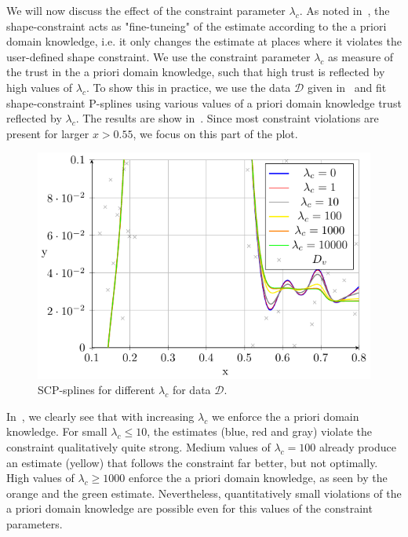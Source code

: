 We will now discuss the effect of the constraint parameter $\lambda_c$. As noted in~, the shape-constraint acts as "fine-tuneing" of the estimate according to the a priori domain knowledge, i.e. it only changes the estimate at places where it violates the user-defined shape constraint. We use the constraint parameter $\lambda_c$ as measure of the trust in the a priori domain knowledge, such that high trust is reflected by high values of $\lambda_c$. To show this in practice, we use the data $\mathcal{D}$ given in~ and fit shape-constraint P-splines using various values of a priori domain knowledge trust reflected by $\lambda_c$. The results are show in~. Since most constraint violations are present for larger $x > 0.55$, we focus on this part of the plot. 

\begin{figure}[H]
	\centering
	\includegraphics{graphics/pgfplots/cha4/exp-lambdas.pdf}
	\caption{SCP-splines for different $\lambda_c$ for data $\mathcal{D}$.}
	\label{fig:example-lambdas}
\end{figure}	

In~, we clearly see that with increasing $\lambda_c$ we enforce the a priori domain knowledge. For small $\lambda_c \le 10$, the estimates (blue, red and gray) violate the constraint qualitatively quite strong. Medium values of $\lambda_c = 100$ already produce an estimate (yellow) that follows the constraint far better, but not optimally. High values of $\lambda_c \ge 1000$ enforce the a priori domain knowledge, as seen by the orange and the green estimate. Nevertheless, quantitatively small violations of the a priori domain knowledge are possible even for this values of the constraint parameters. 


